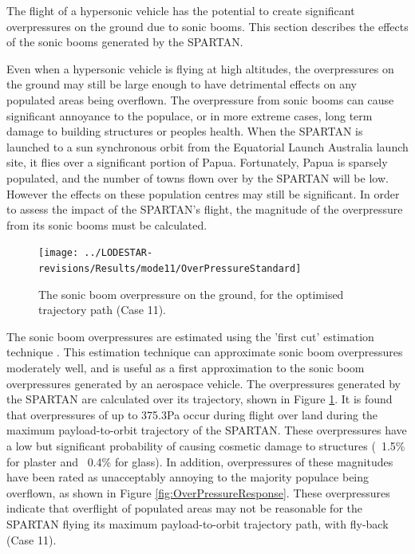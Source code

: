 The flight of a hypersonic vehicle has the potential to create significant overpressures on the ground due to sonic booms. This section describes the effects of the sonic booms generated by the SPARTAN. 

Even when a hypersonic vehicle is flying at high altitudes, the overpressures on the ground may still be large enough to have detrimental effects on any populated areas being overflown. The overpressure from sonic booms can cause significant annoyance to the populace, or in more extreme cases, long term damage to building structures or peoples health. 
When the SPARTAN is launched to a sun synchronous orbit from the Equatorial Launch Australia launch site, it flies over a significant portion of Papua. Fortunately, Papua is sparsely populated, and the number of towns flown over by the SPARTAN will be low. However the effects on these population centres may still be significant. In order to assess the impact of the SPARTAN's flight, the magnitude of the overpressure from its sonic booms must be calculated. 
\begin{figure}[ht]
	\centering
	\texttt{[image: ../LODESTAR-revisions/Results/mode11/OverPressureStandard]}
	\caption{The sonic boom overpressure on the ground, for the optimised trajectory path (Case 11).}
	\label{fig:OverPressureStandard}
\end{figure}

The sonic boom overpressures are estimated using the 'first cut' estimation technique \cite{Carlson1972}. This estimation technique can approximate sonic boom overpressures moderately well, and is useful as a first approximation to the sonic boom overpressures generated by an aerospace vehicle. The overpressures generated by the SPARTAN are calculated over its trajectory, shown in Figure \ref{fig:OverPressureStandard}. It is found that overpressures of up to 375.3Pa occur during flight over land during the maximum payload-to-orbit trajectory of the SPARTAN. These overpressures have a low but significant probability of causing cosmetic damage to structures (~1.5\% for plaster and ~0.4\% for glass)\cite{Hershey1976}. In addition, overpressures of these magnitudes have been rated as unacceptably annoying to the majority populace being overflown, as shown in Figure \ref{fig:OverPressureResponse}. 
These overpressures indicate that overflight of populated areas may not be reasonable for the SPARTAN flying its maximum payload-to-orbit trajectory path, with fly-back (Case 11). 







